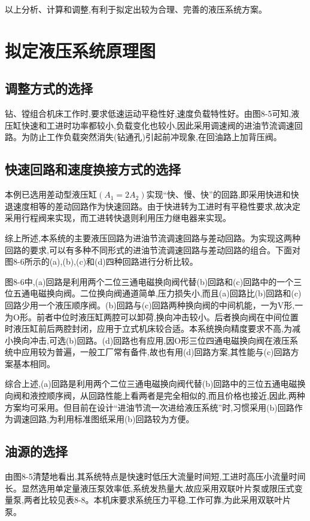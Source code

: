 以上分析、计算和调整,有利于拟定出较为合理、完善的液压系统方案。
\section{拟定液压系统原理图}
\subsection{调整方式的选择}
钻、镗组合机床工作时,要求低速运动平稳性好,速度负载特性好。由图8-5可知,液压缸快速和工进时功率都较小,负载变化也较小,因此采用调速阀的进油节流调速回路。为防止工作负载突然消失(钻通孔)引起前冲现象,在回油路上加背压阀。
\subsection{快速回路和速度换接方式的选择}
本例已选用差动型液压缸$(A_1=2A_2)$实现“快、慢、快”的回路,即采用快进和快退速度相等的差动回路作为快速回路。由于快进转为工进时有平稳性要求,故决定采用行程阀来实现，而工进转快退则利用压力继电器来实现。

综上所述,本系统的主要液压回路为进油节流调速回路与差动回路。为实现这两种回路的要求,可以有多种不同形式的进油节流调速回路与差动回路的组合。下面对图8-6所示的(a),(b),(c)和(d)四种回路进行分析比较。

图8-6中,(a)回路是利用两个二位三通电磁换向阀代替(b)回路和(c)回路中的一个三位五通电磁换向阀。二位换向阀通道简单,压力损失小,而且(a)回路比(b)回路和(c)回路少用一个液压顺序阀。(b)回路与(c)回路两种换向阀的中间机能，一为V形,一为O形。前者中位时液压缸两腔可以卸荷,换向冲击较小。后者换向阀在中间位置时液压缸前后两腔封闭，应用于立式机床较合适。本系统换向精度要求不高,为减小换向冲击,可选(b)回路。(d)回路也有应用,因O形三位四通电磁换向阀在液压系统中应用较为普遍，一般工厂常有备件,故也有用(d)回路方案,其性能与(c)回路方案基本相同。

综合上述,(a)回路是利用两个二位三通电磁换向阀代替(b)回路中的三位五通电磁换向阀和液控顺序阀，从回路性能上看两者是完全相似的,而且价格也接近,因此,两种方案均可采用。但目前在设计“进油节流一次进给液压系统”时,习惯采用(b)回路作为调速回路,为利用标准图纸采用(b)回路较为方便。
\subsection{油源的选择}
由图8-5清楚地看出,其系统特点是快速时低压大流量时间短,工进时高压小流量时间长。显然选用单定量液压泵效率低,系统发热量大,故应采用双联叶片泵或限压式变量泵,两者比较见表8-8。本机床要求系统压力平稳,工作可靠,为此采用双联叶片泵。
